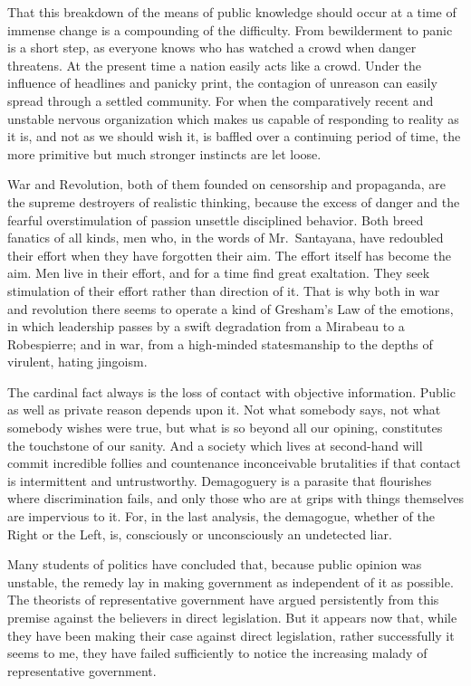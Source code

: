 \documentclass[openany,nobib,twoside,nohyper]{tufte-book}
\begin{document}
That this breakdown of the means of public knowledge should occur at a
time of immense change is a compounding of the difficulty. From
bewilderment to panic is a short step, as everyone knows who has watched
a crowd when danger threatens. At the present time a nation easily acts
like a crowd. Under the influence of headlines and panicky print, the
contagion of unreason can easily spread through a settled community. For
when the comparatively recent and unstable nervous organization which
makes us capable of responding to reality as it is, and not as we should
wish it, is baffled over a continuing period of time, the more primitive
but much stronger instincts are let loose.

War and Revolution, both of them founded on censorship and propaganda,
are the supreme destroyers of realistic thinking, because the excess of
danger and the fearful overstimulation of passion unsettle disciplined
behavior. Both breed fanatics of all kinds, men who, in the words of
Mr.~Santayana, have redoubled their effort when they have forgotten
their aim. The effort itself has become the aim. Men live in their
effort, and for a time find great exaltation. They seek stimulation of
their effort rather than direction of it. That is why both in war and
revolution there seems to operate a kind of Gresham's Law of the
emotions, in which leadership passes by a swift degradation from a
Mirabeau to a Robespierre; and in war, from a high-minded statesmanship
to the depths of virulent, hating jingoism.

The cardinal fact always is the loss of contact with objective
information. Public as well as private reason depends upon it. Not what
somebody says, not what somebody wishes were true, but what is so beyond
all our opining, constitutes the touchstone of our sanity. And a society
which lives at second-hand will commit incredible follies and
countenance inconceivable brutalities if that contact is intermittent
and untrustworthy. Demagoguery is a parasite that flourishes where
discrimination fails, and only those who are at grips with things
themselves are impervious to it. For, in the last analysis, the
demagogue, whether of the Right or the Left, is, consciously or
unconsciously an undetected liar.

Many students of politics have concluded that, because public opinion
was unstable, the remedy lay in making government as independent of it
as possible. The theorists of representative government have argued
persistently from this premise against the believers in direct
legislation. But it appears now that, while they have been making their
case against direct legislation, rather successfully it seems to me,
they have failed sufficiently to notice the increasing malady of
representative government.
\end{document}

